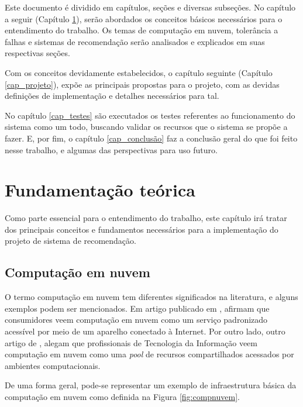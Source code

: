 \documentclass[
	12pt,				%
	oneside,			%
	a4paper,			%
	chapter=TITLE,		%
	english,			%
	french,				%
	spanish,			%
	brazil				%
	]{abntex2}
\begin{document}
Este documento é dividido em capítulos, seções e diversas subseções. No capítulo a seguir (Capítulo \ref{cap_conceitos}), serão abordados os conceitos básicos necessários para o entendimento do trabalho. Os temas de computação em nuvem, tolerância a falhas e sistemas de recomendação serão analisados e explicados em suas respectivas seções.

Com os conceitos devidamente estabelecidos, o capítulo seguinte (Capítulo \ref{cap_projeto}), expõe as principais propostas para o projeto, com as devidas definições de implementação e detalhes necessários para tal.

No capítulo \ref{cap_testes} são executados os testes referentes ao funcionamento do sistema como um todo, buscando validar os recursos que o sistema se propõe a fazer. E, por fim, o capítulo \ref{cap_conclusão} faz a conclusão geral do que foi feito nesse trabalho, e algumas das perspectivas para uso futuro.


\chapter{Fundamentação teórica}\label{cap_conceitos}

Como parte essencial para o entendimento do trabalho, este capítulo irá tratar dos principais conceitos e fundamentos necessários para a implementação do projeto de sistema de recomendação.

\section{Computação em nuvem}\label{sec_comp_nuv}

O termo computação em nuvem tem diferentes significados na literatura, e alguns exemplos podem ser mencionados. Em artigo publicado em \citeyear{fernando2013mobile}, \citeauthor{fernando2013mobile} afirmam que consumidores veem computação em nuvem como um serviço padronizado acessível por meio de um aparelho conectado à Internet. Por outro lado, outro artigo de \citeyear{mazhelis2012economic}, \citeauthor{mazhelis2012economic} alegam que profissionais de Tecnologia da Informação veem computação em nuvem como uma \emph{pool} de recursos compartilhados acessados por ambientes computacionais. \cite[p. 1]{khan2018cloud}

De uma forma geral, pode-se representar um exemplo de infraestrutura básica da computação em nuvem como definida na Figura \ref{fig:compnuvem}.
\end{document}
